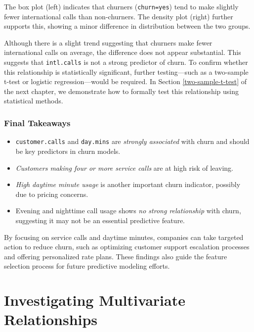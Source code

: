 \documentclass[
  11pt,
]{book}
\newcommand{\passthrough}[1]{#1}
\providecommand{\tightlist}{%
  \setlength{\itemsep}{0pt}\setlength{\parskip}{0pt}}
\theoremstyle{definition}
\theoremstyle{definition}
\theoremstyle{definition}
\theoremstyle{definition}
\theoremstyle{remark}
\begin{document}
The box plot (left) indicates that churners (\passthrough{\lstinline!churn=yes!}) tend to make slightly fewer international calls than non-churners. The density plot (right) further supports this, showing a minor difference in distribution between the two groups.

Although there is a slight trend suggesting that churners make fewer international calls on average, the difference does not appear substantial. This suggests that \passthrough{\lstinline!intl.calls!} is not a strong predictor of churn. To confirm whether this relationship is statistically significant, further testing---such as a two-sample t-test or logistic regression---would be required. In Section \ref{two-sample-t-test} of the next chapter, we demonstrate how to formally test this relationship using statistical methods.

\subsubsection*{Final Takeaways}\label{final-takeaways}


\begin{itemize}
\tightlist
\item
  \passthrough{\lstinline!customer.calls!} and \passthrough{\lstinline!day.mins!} are \emph{strongly associated} with churn and should be key predictors in churn models.\\
\item
  \emph{Customers making four or more service calls} are at high risk of leaving.\\
\item
  \emph{High daytime minute usage} is another important churn indicator, possibly due to pricing concerns.\\
\item
  Evening and nighttime call usage shows \emph{no strong relationship} with churn, suggesting it may not be an essential predictive feature.
\end{itemize}

By focusing on service calls and daytime minutes, companies can take targeted action to reduce churn, such as optimizing customer support escalation processes and offering personalized rate plans. These findings also guide the feature selection process for future predictive modeling efforts.

\section{Investigating Multivariate Relationships}\label{EDA-sec-multivariate}
\end{document}
